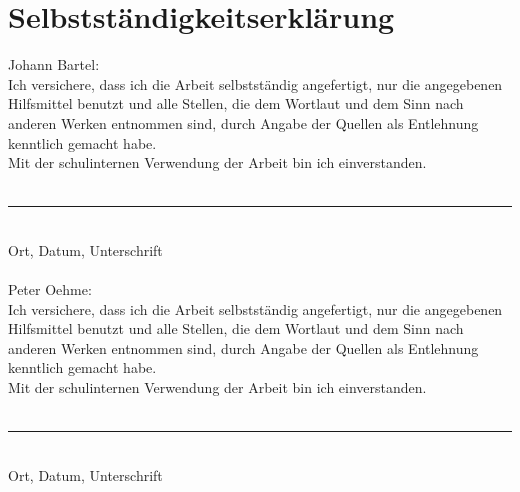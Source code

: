 \section*{Selbstständigkeitserklärung}
Johann Bartel:\\
Ich versichere, dass ich die Arbeit selbstständig angefertigt, nur die angegebenen Hilfsmittel benutzt und alle Stellen, die dem Wortlaut und dem Sinn nach anderen Werken entnommen sind, durch Angabe der Quellen als Entlehnung kenntlich gemacht habe.\\
Mit der schulinternen Verwendung der Arbeit bin ich einverstanden.\\\\
\rule{10cm}{0.1mm}\\
Ort, Datum, Unterschrift\\\\
Peter Oehme:\\
Ich versichere, dass ich die Arbeit selbstständig angefertigt, nur die angegebenen Hilfsmittel benutzt und alle Stellen, die dem Wortlaut und dem Sinn nach anderen Werken entnommen sind, durch Angabe der Quellen als Entlehnung kenntlich gemacht habe.\\
Mit der schulinternen Verwendung der Arbeit bin ich einverstanden.\\\\
\rule{10cm}{0.1mm}\\
Ort, Datum, Unterschrift
